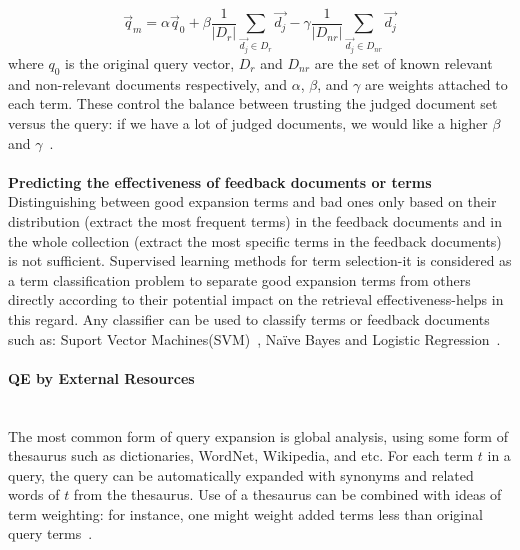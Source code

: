 \begin{equation}
\label{eq:rocchio}
 \vec{q}_{m} = \alpha  \vec{q}_{0} + \beta\frac{1}{|D_{r}|}\sum\limits_{\vec{d_{j}}\in D_{r}} \vec{d_{j}} - \gamma\frac{1}{|D_{nr}|}\sum\limits_{\vec{d_{j}}\in D_{nr}} \vec{d_{j}}
  \end{equation}
where $ q_{0} $ is the original query vector, $ D_{r} $ and $ D_{nr} $ are the set of known relevant and non-relevant documents respectively, and $ \alpha $, $ \beta $, and $ \gamma $ are weights attached to each term. These control the balance between trusting the judged document set versus the query: if we have a lot of judged documents, we
would like a higher $ \beta $ and $ \gamma $~\citep{manning2008introduction}. 
\\\\
\textbf{Predicting the effectiveness of feedback documents or terms } 
\ \\
Distinguishing between good expansion terms and bad ones only based on their distribution (extract the most frequent terms) in the feedback documents and in the whole collection (extract the most specific terms in the feedback documents) is not sufficient. Supervised learning methods for term selection-it is considered as a term classification problem to separate good expansion terms from others directly according to their potential impact on the retrieval effectiveness-helps in this regard. Any classifier can be used to classify terms or feedback documents such as: Suport Vector Machines(SVM)~\citep{cao2008selecting}, Na\"ive Bayes and Logistic Regression~\citep{he2009finding}. 

\paragraph{QE by External Resources}
\ \\
The most common form of query expansion is global analysis, using some form of thesaurus such as dictionaries, WordNet, Wikipedia, and etc. For each term $ t $ in a query, the query can be automatically expanded with synonyms and related words of $ t $ from the thesaurus. Use of a thesaurus can be combined with ideas of term weighting: for instance, one might weight added terms less than original query terms~\citep{manning2008introduction}.